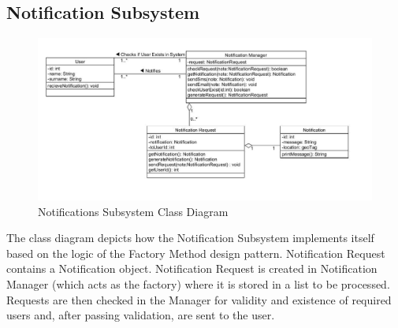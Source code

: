 \documentclass{article}
\begin{document}
				
			
			
			\subsection{Notification Subsystem}\label{subsec:notification}
			
				\begin{figure}[h!]
					\includegraphics[scale=0.5]{Diagrams/Class_Diagram_Notifications.JPG}
					\caption{Notifications Subsystem Class Diagram}	
				\end{figure}
				{The class diagram depicts how the Notification Subsystem implements itself based on the logic of the Factory Method design pattern. Notification Request contains a Notification object. Notification Request is created in Notification Manager (which acts as the factory) where it is stored in a list to be processed. Requests are then checked in the Manager for validity and existence of required users and, after passing validation, are sent to the user.\\\\}
			
\end{document}
